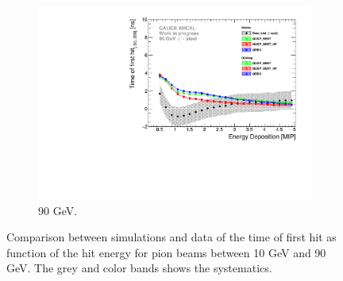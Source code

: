 \begin{figure}[htbp!]
\begin{subfigure}[t]{0.5\textwidth}
		\includegraphics[width=1\textwidth]{chap5/fig_AHCAL_timing/Pions/ComparisonToSim/Time_Energy_90GeV.pdf}
		\caption{90 GeV.} \label{fig:Energy_SimData_90GeV}
	\end{subfigure}
	\caption{Comparison between simulations and data of the time of first hit as function of the hit energy for pion beams between 10 GeV and 90 GeV. The grey and color bands shows the systematics.}
	\label{fig:Energy_SimData_Comparison}
\end{figure}

